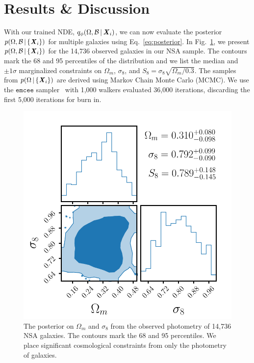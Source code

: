 \section{Results \& Discussion} \label{sec:results}
With our trained NDE, $q_{\phi}(\Omega, \mathcal{B}\,|\, {\textbf{\textit{X}}_i})$, we can
now evaluate the posterior $p(\Omega, \mathcal{B}\,|\,\{\textbf{\textit{X}}_i\})$ for
multiple galaxies using Eq.~\ref{eq:posterior}. 
In Fig.~\ref{fig:p_omega_x}, we present 
$p(\Omega, \mathcal{B}\,|\,\{\textbf{\textit{X}}_i\})$ for the 14,736 observed galaxies in
our NSA sample.
The contours mark the 68 and 95 percentiles of the distribution and we list the
median and $\pm1\sigma$ marginalized constraints on $\Omega_m$, $\sigma_8$, and
$S_8 = \sigma_8\sqrt{\Omega_m/0.3}$. 
The samples from $p(\Omega\,|\,\{\textbf{\textit{X}}_i\})$ are derived using Markov Chain
Monte Carlo (MCMC). 
We use the $\mathtt{emcee}$ sampler~\citep{foreman-mackey2013} with 1,000
walkers evaluated 36,000 iterations, discarding the first 5,000 iterations for
burn in.

\begin{figure}[ht]
\vskip 0.2in
\begin{center}
    \centerline{\includegraphics[width=0.9\columnwidth]{figs/p_oms8_x.pdf}}
    \caption{The posterior on $\Omega_m$ and $\sigma_8$ from the observed
    photometry of 14,736 NSA galaxies.
    The contours mark the 68 and 95 percentiles. 
    We place significant cosmological constraints from only the photometry of 
    galaxies. 
    }\label{fig:p_omega_x}
\end{center}
\vskip -0.2in
\end{figure}


